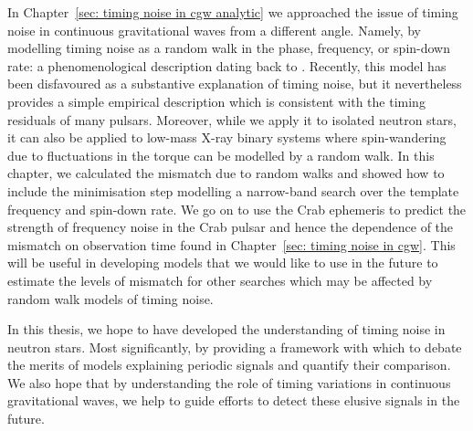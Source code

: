 \documentclass[twoside, 11pt]{thesis}
\begin{document}
In Chapter~\ref{sec: timing noise in cgw analytic} we approached the issue of
timing noise in continuous gravitational waves from a different angle. Namely,
by modelling timing noise as a random walk in the phase, frequency, or
spin-down rate: a phenomenological description dating back to
\citet{Boynton1972}. Recently, this model has been disfavoured
\citep{Hobbs2010} as a substantive explanation of timing noise, but it
nevertheless provides a simple empirical description which is consistent with
the timing residuals of many pulsars. Moreover, while we apply it to isolated
neutron stars, it can also be applied to low-mass X-ray binary systems where
spin-wandering due to fluctuations in the torque can be modelled by a random
walk. In this chapter, we calculated the mismatch due to random walks and
showed how to include the minimisation step modelling a narrow-band search over
the template frequency and spin-down rate.  We go on to use the Crab ephemeris
to predict the strength of frequency noise in the Crab pulsar and hence the
dependence of the mismatch on observation time found in Chapter~\ref{sec:
timing noise in cgw}. This will be useful in developing models that we would
like to use in the future to estimate the levels of mismatch for other searches
which may be affected by random walk models of timing noise.


In this thesis, we hope to have developed the understanding of timing noise in
neutron stars. Most significantly, by providing a framework with which to debate
the merits of models explaining periodic signals and quantify their comparison.
We also hope that by understanding the role of timing variations in continuous
gravitational waves, we help to guide efforts to detect these elusive signals
in the future.







\end{document}
